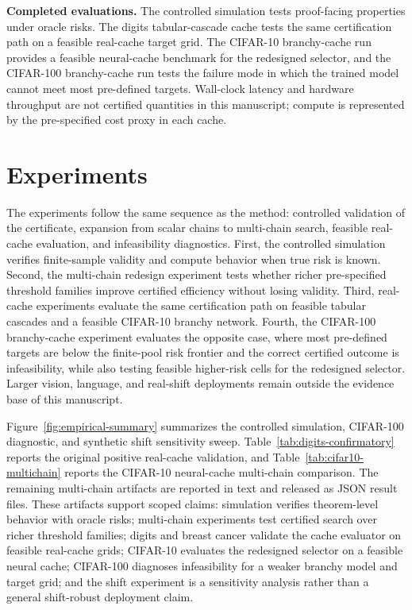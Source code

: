 \documentclass{ieeeaccess}
\begin{document}
\textbf{Completed evaluations.} The controlled simulation tests proof-facing properties under oracle risks. The digits tabular-cascade cache tests the same certification path on a feasible real-cache target grid. The CIFAR-10 branchy-cache run provides a feasible neural-cache benchmark for the redesigned selector, and the CIFAR-100 branchy-cache run tests the failure mode in which the trained model cannot meet most pre-defined targets. Wall-clock latency and hardware throughput are not certified quantities in this manuscript; compute is represented by the pre-specified cost proxy in each cache.

\section{Experiments}

The experiments follow the same sequence as the method: controlled validation of the certificate, expansion from scalar chains to multi-chain search, feasible real-cache evaluation, and infeasibility diagnostics. First, the controlled simulation verifies finite-sample validity and compute behavior when true risk is known. Second, the multi-chain redesign experiment tests whether richer pre-specified threshold families improve certified efficiency without losing validity. Third, real-cache experiments evaluate the same certification path on feasible tabular cascades and a feasible CIFAR-10 branchy network. Fourth, the CIFAR-100 branchy-cache experiment evaluates the opposite case, where most pre-defined targets are below the finite-pool risk frontier and the correct certified outcome is infeasibility, while also testing feasible higher-risk cells for the redesigned selector. Larger vision, language, and real-shift deployments remain outside the evidence base of this manuscript.

Figure~\ref{fig:empirical-summary} summarizes the controlled simulation, CIFAR-100 diagnostic, and synthetic shift sensitivity sweep. Table~\ref{tab:digits-confirmatory} reports the original positive real-cache validation, and Table~\ref{tab:cifar10-multichain} reports the CIFAR-10 neural-cache multi-chain comparison. The remaining multi-chain artifacts are reported in text and released as JSON result files. These artifacts support scoped claims: simulation verifies theorem-level behavior with oracle risks; multi-chain experiments test certified search over richer threshold families; digits and breast cancer validate the cache evaluator on feasible real-cache grids; CIFAR-10 evaluates the redesigned selector on a feasible neural cache; CIFAR-100 diagnoses infeasibility for a weaker branchy model and target grid; and the shift experiment is a sensitivity analysis rather than a general shift-robust deployment claim.
\end{document}
